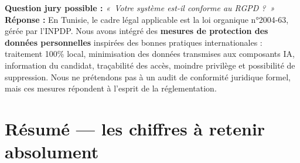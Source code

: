 \documentclass[12pt,a4paper]{article}
\newenvironment{jury}{%
  \def\FrameCommand{\fboxsep=8pt\colorbox{orange!12}}%
  \MakeFramed{\advance\hsize-\width \FrameRestore}%
  \vspace{-4pt}%
}{\endMakeFramed}
\begin{document}
\begin{jury}
\textbf{Question jury possible :} \textit{«~Votre système est-il conforme au RGPD ?~»}\\[4pt]
\textbf{Réponse :} En Tunisie, le cadre légal applicable est la loi organique n°2004-63, gérée par l'INPDP. Nous avons intégré des \textbf{mesures de protection des données personnelles} inspirées des bonnes pratiques internationales : traitement 100\% local, minimisation des données transmises aux composants IA, information du candidat, traçabilité des accès, moindre privilège et possibilité de suppression. Nous ne prétendons pas à un audit de conformité juridique formel, mais ces mesures répondent à l'esprit de la réglementation.
\end{jury}

\newpage

\section{Résumé — les chiffres à retenir absolument}
\end{document}
